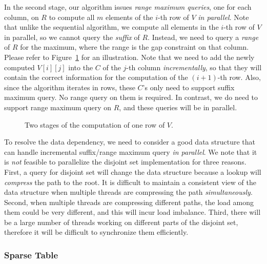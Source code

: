 In the second stage, our algorithm issues {\em range maximum queries},
one for each column, on $R$ to compute all $m$ elements of the $i$-th
row of $V$ {\em in parallel}.  Note that unlike the sequential
algorithm, we compute all elements in the $i$-th row of $V$ in parallel,
so we cannot query the {\em suffix} of $R$.  Instead, we need to query a
{\em range} of $R$ for the maximum, where the range is the gap
constraint on that column.  Please refer to
Figure~\ref{fig:fig-VGLCS-dp-rmq} for an illustration.  Note that we
need to add the newly computed $V[i][j]$ into the $C$ of the $j$-th
column {\em incrementally}, so that they will contain the correct
information for the computation of the $(i+1)$-th row.  Also, since the
algorithm iterates in rows, these $C$'s only need to support suffix
maximum query.  No range query on them is required.  In contrast, we do
need to support range maximum query on $R$, and these queries will be in
parallel.

\begin{figure}[!thb]
  \centering {} 
  \caption{Two stages of the computation of one row of $V$.}
  \label{fig:fig-VGLCS-dp-rmq}
\end{figure}

To resolve the data dependency, we need to consider a good data
structure that can handle incremental suffix/range maximum query {\em in
parallel}.  We note that it is {\em not} feasible to parallelize the
disjoint set implementation for three reasons.  First, a query for
disjoint set will change the data structure because a lookup will {\em
compress} the path to the root.  It is difficult to maintain a
consistent view of the data structure when multiple threads are
compressing the path {\em simultaneously}.  Second, when multiple
threads are compressing different paths, the load among them could be
very different, and this will incur load imbalance.  Third, there will
be a large number of threads working on different parts of the disjoint
set, therefore it will be difficult to synchronize them efficiently.

\subsubsection{Sparse Table} \label{sec:sparse-table}

